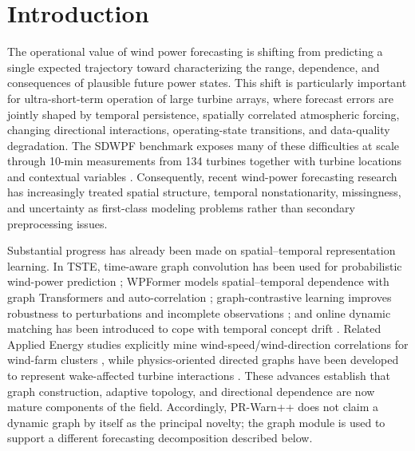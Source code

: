 \documentclass[journal]{IEEEtran}
\newcommand{\1}{\mathbb{I}}
\begin{document}
\section{Introduction}
The operational value of wind power forecasting is shifting from predicting a single expected trajectory toward characterizing the range, dependence, and consequences of plausible future power states. This shift is particularly important for ultra-short-term operation of large turbine arrays, where forecast errors are jointly shaped by temporal persistence, spatially correlated atmospheric forcing, changing directional interactions, operating-state transitions, and data-quality degradation. The SDWPF benchmark exposes many of these difficulties at scale through 10-min measurements from 134 turbines together with turbine locations and contextual variables \cite{zhou2024sdwpf}. Consequently, recent wind-power forecasting research has increasingly treated spatial structure, temporal nonstationarity, missingness, and uncertainty as first-class modeling problems rather than secondary preprocessing issues.

Substantial progress has already been made on spatial--temporal representation learning. In TSTE, time-aware graph convolution has been used for probabilistic wind-power prediction \cite{tang2024timeaware}; WPFormer models spatial--temporal dependence with graph Transformers and auto-correlation \cite{liang2025wpformer}; graph-contrastive learning improves robustness to perturbations and incomplete observations \cite{liu2025graphcontrast}; and online dynamic matching has been introduced to cope with temporal concept drift \cite{li2025dynamic}. Related Applied Energy studies explicitly mine wind-speed/wind-direction correlations for wind-farm clusters \cite{wang2025clustergraph}, while physics-oriented directed graphs have been developed to represent wake-affected turbine interactions \cite{hou2026wake}. These advances establish that graph construction, adaptive topology, and directional dependence are now mature components of the field. Accordingly, PR-Warn++ does not claim a dynamic graph by itself as the principal novelty; the graph module is used to support a different forecasting decomposition described below.
\end{document}
